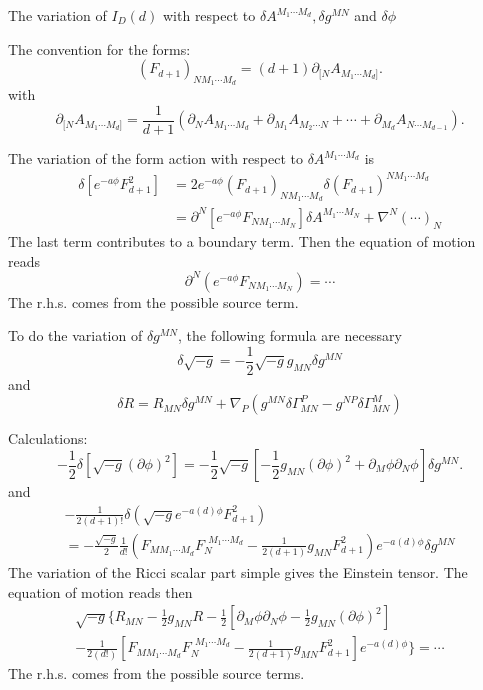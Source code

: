 The variation of $I_{D}(d)$ with respect to
$\delta A^{M_1\cdots M_d},\delta g^{MN}$ and $\delta\phi$

\begin{info}
The convention for the forms:
\[
	(F_{d+1})_{N M_1 \cdots M_d} = (d+1) \partial_{[N} A_{M_1\cdots M_d]}
.\] 
with
\[
\partial_{[N} A_{M_1\cdots M_d]} = \frac{1}{d+1}
\left( \partial_{N} A_{M_1\cdots M_d} +\partial_{M_1} A_{M_2\cdots N} +\cdots+\partial_{M_d} A_{N\cdots M_{d-1}}  
 \right) 
.\] 
\end{info}

The variation of the form action with respect to $\delta A^{M_1\cdots M_d}$ is
\begin{align*}
	\delta \left[e^{-a \phi} F_{d+1}^2\right] &= 2 e^{-a \phi} (F_{d+1})_{N M_1 \cdots M_d}
	\delta (F_{d+1})^{N M_1 \cdots M_d} \\
	&= \partial^N \left[ e^{-a\phi} F_{N M_1\cdots M_N} \right] 
	\delta A^{M_1\cdots M_N}
	+ \nabla^N (\cdots)_N
\end{align*}
The last term contributes to a boundary term.
Then the equation of motion reads
\begin{equation}
	\partial^N \left( e^{-a\phi} F_{N M_1\cdots M_N} \right) = \cdots 	
\end{equation}
The r.h.s. comes from the possible source term.

\begin{info}
	To do the variation of $\delta g^{MN}$,
	the following formula are necessary
	\begin{equation}
		\delta \sqrt{-g} = - \frac{1}{2} \sqrt{-g}
		g_{MN}\delta g^{MN}
	\end{equation}
	and
	\begin{equation}
		\delta R = R_{MN} \delta g^{MN}
		+ \nabla_{P} (g^{MN}\delta \Gamma^P_{MN}
		-g^{NP}\delta\Gamma^M_{MN})
	\end{equation}
\end{info}

Calculations:
\[
	-\frac{1}{2}\delta \left[ \sqrt{-g} (\partial \phi)^2\right] 
	=-\frac{1}{2} \sqrt{-g}\left[ -\frac{1}{2} g_{MN}(\partial\phi)^2
	+\partial_M\phi \partial_N\phi\right] \delta g^{MN}
.\] 
and
\begin{align*}
	- \frac{1}{2(d+1)!} \delta \left( \sqrt{-g} e^{-a(d) \phi} F_{d+1}^2 \right)  \\
	= - \frac{\sqrt{-g}}{2} \frac{1}{d!}
	\left( F_{M M_1\cdots M_d} F_{N}^{~~M_1\cdots M_d} 
	-\frac{1}{2(d+1)} g_{MN} F_{d+1}^2\right) 
	e^{-a(d)\phi} \delta g^{MN}
\end{align*}
The variation of the Ricci scalar part
simple gives the Einstein tensor.
The equation of motion reads then
\begin{align*}
	\sqrt{-g} \Bigg\{ R_{MN} - \frac{1}{2} g_{MN}R
	-\frac{1}{2} \left[ \partial_M\phi \partial_N\phi-\frac{1}{2} g_{MN}(\partial\phi)^2
	\right]  \\
- \frac{1}{2(d!)}\left[ F_{M M_1\cdots M_d} F_{N}^{~~M_1\cdots M_d} 
	-\frac{1}{2(d+1)} g_{MN} F_{d+1}^2\right] 
	e^{-a(d)\phi} 
\Bigg\} = \cdots
\end{align*}
The r.h.s. comes from the possible source terms.
